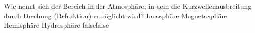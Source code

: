     {Wie nennt sich der Bereich in der Atmosphäre, in dem die Kurzwellenausbreitung durch Brechung (Refraktion) ermöglicht wird?}
    {Ionosphäre}
    {Magnetosphäre}
    {Hemisphäre}
    {Hydrosphäre}
    {false}{false}